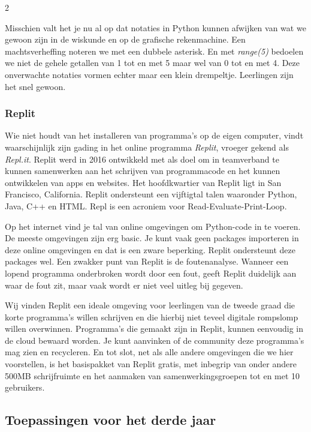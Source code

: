 	\begin{multicols}{2}
	
	Misschien valt het je nu al op dat notaties in Python kunnen afwijken van wat we gewoon zijn in de wiskunde en op de grafische rekenmachine. Een machtsverheffing noteren we met een dubbele asterisk. En met \emph{range(5)} bedoelen we niet de gehele getallen van 1 tot en met 5 maar wel van 0 tot en met 4. Deze onverwachte notaties vormen echter maar een klein drempeltje. Leerlingen zijn het snel gewoon.

	\subsubsection*{Replit}
	
	Wie niet houdt van het installeren van programma's op de eigen computer, vindt waarschijnlijk zijn gading in het online programma \emph{Replit}, vroeger gekend als \emph{Repl.it}. Replit werd in 2016 ontwikkeld met als doel om in teamverband te kunnen samenwerken aan het schrijven van programmacode en het kunnen ontwikkelen van apps en websites. Het hoofdkwartier van Replit ligt in San Francisco, California. Replit ondersteunt een vijftigtal talen waaronder Python, Java, C++ en HTML. Repl is een acroniem voor Read-Evaluate-Print-Loop. 
	
	Op het internet vind je tal van online omgevingen om Python-code in te voeren. De meeste omgevingen zijn erg basic. Je kunt vaak geen packages importeren in deze online omgevingen en dat is een zware beperking. Replit ondersteunt deze packages wel. Een zwakker punt van Replit is de foutenanalyse. Wanneer een lopend programma onderbroken wordt door een fout, geeft Replit duidelijk aan waar de fout zit, maar vaak wordt er niet veel uitleg bij gegeven. 
	
	
	Wij vinden Replit een ideale omgeving voor leerlingen van de tweede graad die korte programma's willen schrijven en die hierbij niet teveel digitale rompslomp willen overwinnen. Programma's die gemaakt zijn in Replit, kunnen eenvoudig in de cloud bewaard worden. Je kunt aanvinken of de community deze programma's mag zien en recycleren. En tot slot, net als alle andere omgevingen die we hier voorstellen, is het basispakket van Replit gratis, met inbegrip van onder andere 500MB schrijfruimte en het aanmaken van samenwerkingsgroepen tot en met 10 gebruikers.
	

	\subsection{Toepassingen voor het derde jaar}
	

\end{multicols}
